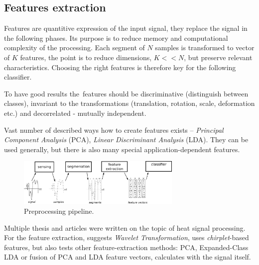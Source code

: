 \subsection*{Features extraction}
Features are quantitive expression of the input signal, they replace the signal in the following phases.
Its purpose is to reduce memory and computational complexity of the processing. Each segment of $N$ samples
is transformed to vector of $K$ features, the point is to reduce dimensions, $K << N$, but preserve
relevant characteristics. Choosing the right features is therefore key for the following classifier.

To have good results the~features should be discriminative (distinguish between classes), invariant to
the transformations (translation, rotation, scale, deformation etc.) and decorrelated - mutually independent.

Vast number of described ways how to create features exists -- {\it Principal Component Analysis} (PCA),
{\it Linear Discriminant Analysis} (LDA). They can be used generally, but there is also many special
application-dependent features. 

\begin{figure}[h!]
\begin{center}
\includegraphics[width=0.7\textwidth]{img/featureextraction.png}
\caption{Preprocessing pipeline.\label{fig:featureextraction}}
\end{center}
\end{figure}

Multiple thesis and articles were written on the topic of heat signal processing. For the feature extraction,
\cite{SinglePIR} suggests {\it Wavelet Transformation}, \cite{ChirpletSVM} uses {\it chirplet}-based features,
but also tests other feature-extraction methods: PCA, Expanded-Class LDA or fusion of PCA and LDA feature vectors,
\cite{BayesanClassifier} calculates with the signal itself.

